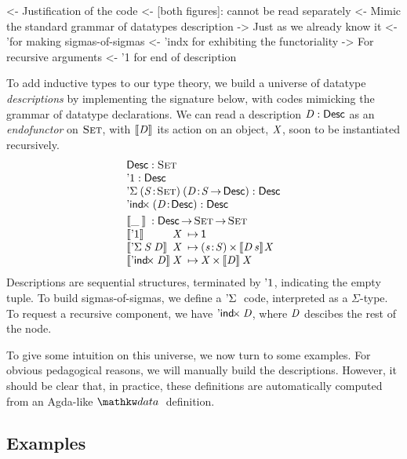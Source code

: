 \begin{wstructure}
<- Justification of the code 
    <- [both figures]: cannot be read separately
    <- Mimic the standard grammar of datatypes description
        -> Just as we already know it
        <- '\Sigma for making sigmas-of-sigmas
        <- 'indx for exhibiting the functoriality
            -> For recursive arguments
        <- '1 for end of description
\end{wstructure}

To add inductive types to our type theory, we build a universe of
datatype \emph{descriptions} by implementing the signature below, with
codes mimicking the grammar of datatype declarations. We
can read a description $\V{D}:\Desc$ as an \emph{endofunctor}
on $\Set$, with $\descop{\V{D}}{\!}$ its action on an object, \(\V{X}\), soon
to be instantiated recursively.
%
\[\stk{
\begin{array}{l}
\Desc : \Set\\
\DUnit : \Desc\\
\DSigma{(\Bhab{\V{S}}{\Set})}{(\Bhab{\V{D}}{\V{S} \To \Desc})} : \Desc\\
\DIndx{(\Bhab{\V{D}}{\Desc})} : \Desc \\
\end{array}
\smallskip\\
\begin{array}{l@{\V{X}\:\mapsto\:}l}     
\multicolumn{2}{l}{\descop{\_\:}{} : \Desc \To \Set \To \Set} \\
 \descop{\DUnit}{} &  \Unit \\
 \descop{\DSigma{\V{S}}{\V{D}}}{} &
     \SIGMAS{\Bhab{\V{s}}{\V{S}}}{\descop{\V{D}\,\V{s}}{\!\V{X}}}  \\
\descop{\DIndx{\V{D}}}{}  &  \TIMES{\V{X}}{\descop{\V{D}}{\V{X}}}
\end{array}
}\]
%
Descriptions are sequential structures, terminated by $\DUnit$, indicating
the empty tuple. To build
sigmas-of-sigmas, we define a $\DSigma{\!}{}$ code, interpreted as a
$\Sigma$-type. To request a recursive component, we have $\DIndx{\V{D}}$,
where \(\V{D}\) descibes the rest of the node.

To give some intuition on this universe, we now turn to some
examples. For obvious pedagogical reasons, we will manually build the
descriptions. However, it should be clear that, in practice, these
definitions are automatically computed from an Agda-like $\data$
definition.

\subsection{Examples}
\label{sec:desc-examples}

